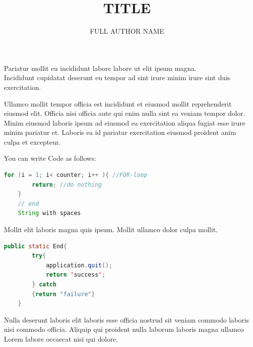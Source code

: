\documentclass
    [   %
        repeatauthor,           %
        a4paper                 %
    ]{uhhassignment}
\begin{document}
\author[SHORT AUTHOR]{FULL AUTHOR NAME }



\title{TITLE}

\maketitle                  %


\label{tsk: Task1}

Pariatur mollit eu incididunt labore labore ut elit ipsum magna.\\
Incididunt cupidatat deserunt eu tempor ad sint irure minim irure sint duis exercitation.

Ullamco mollit tempor officia est incididunt et eiusmod mollit reprehenderit eiusmod elit. 
Officia nisi officia aute qui enim nulla sint ea veniam tempor dolor.\\
Minim eiusmod laboris ipsum ad eiusmod ea exercitation aliqua fugiat esse irure minim pariatur et.
 Laboris ea id pariatur exercitation eiusmod proident anim culpa et excepteur.

You can write Code as follows:

\begin{lstlisting}[language = Java, firstnumber = 100]
    for (i = 1; i< counter; i++ ){ //FOR-loop
        return; //do nothing
    }
    // end
    String with spaces
\end{lstlisting}

Mollit elit laboris magna quis ipsum. 
Mollit ullamco dolor culpa mollit. 
\begin{lstlisting}[language = Java]
    public static End{
        try{
            application.quit();
            return 'success';
        } catch
        {return "failure"}
    }
\end{lstlisting}
Nulla deserunt laboris elit laboris esse officia nostrud sit veniam commodo laboris nisi commodo officia. 
Aliquip qui proident nulla laborum laboris magna ullamco Lorem labore occaecat nisi qui dolore.
\end{document}
